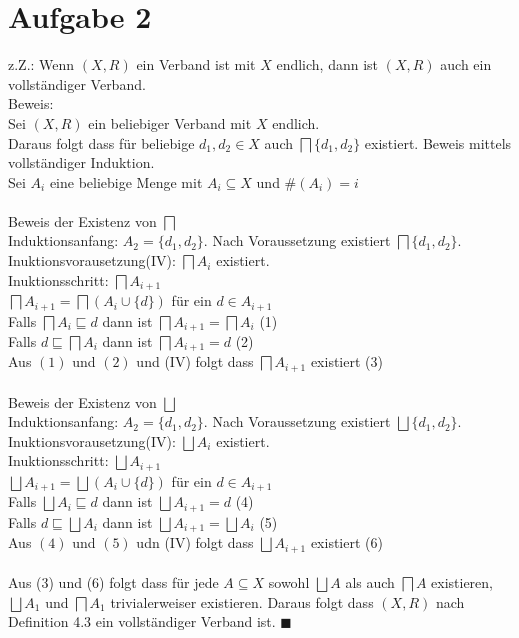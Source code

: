 \section*{Aufgabe 2}

z.Z.: Wenn $(X,R)$ ein Verband ist mit $X$ endlich, dann ist $(X,R)$ auch ein vollständiger Verband.\\

Beweis:\\
Sei $(X,R)$ ein beliebiger Verband mit $X$ endlich.\\
Daraus folgt dass für beliebige $d_1, d_2 \in X$ auch $\bigsqcap \{d_1,d_2\}$ existiert.
Beweis mittels vollständiger Induktion.\\
Sei $A_i$ eine beliebige Menge mit $A_i \subseteq X$ und $\#(A_i) = i$\\\\
Beweis der Existenz von $\bigsqcap$\\
Induktionsanfang: $A_2 = \{d_1,d_2\}$. Nach Voraussetzung existiert $\bigsqcap \{d_1,d_2\}$.\\
Inuktionsvorausetzung(IV): $\bigsqcap A_i$ existiert.\\
Inuktionsschritt: $\bigsqcap A_{i+1}$ \\
$\bigsqcap A_{i+1} = \bigsqcap(A_{i} \cup \{d\})$ für ein $d \in A_{i+1}$\\
Falls $\bigsqcap A_{i} \sqsubseteq d$ dann ist $\bigsqcap A_{i+1} = \bigsqcap A_{i}$ (1)\\
Falls $d \sqsubseteq \bigsqcap A_{i}$ dann ist $\bigsqcap A_{i+1} = d$ (2)\\
Aus $(1)$ und $(2)$ und (IV) folgt dass $\bigsqcap A_{i+1}$ existiert (3)\\\\
Beweis der Existenz von $\bigsqcup$\\
Induktionsanfang: $A_2 = \{d_1,d_2\}$. Nach Voraussetzung existiert $\bigsqcup \{d_1,d_2\}$.\\
Inuktionsvorausetzung(IV): $\bigsqcup A_i$ existiert.\\
Inuktionsschritt: $\bigsqcup A_{i+1}$ \\
$\bigsqcup A_{i+1} = \bigsqcup(A_{i} \cup \{d\})$ für ein $d \in A_{i+1}$\\
Falls $\bigsqcup A_{i} \sqsubseteq d$ dann ist $\bigsqcup A_{i+1} = d$ (4)\\
Falls $d \sqsubseteq \bigsqcup A_{i}$ dann ist $\bigsqcup A_{i+1} = \bigsqcup A_{i}$ (5)\\
Aus $(4)$ und $(5)$ udn (IV) folgt dass $\bigsqcup A_{i+1}$ existiert (6)\\\\
Aus (3) und (6) folgt dass für jede $A \subseteq X$ sowohl  $\bigsqcup A$ als auch $\bigsqcap A$ existieren, $\bigsqcup A_1$  und $\bigsqcap A_1$ trivialerweiser existieren. Daraus folgt dass $(X,R)$ nach Definition 4.3 ein vollständiger Verband ist. $\blacksquare$